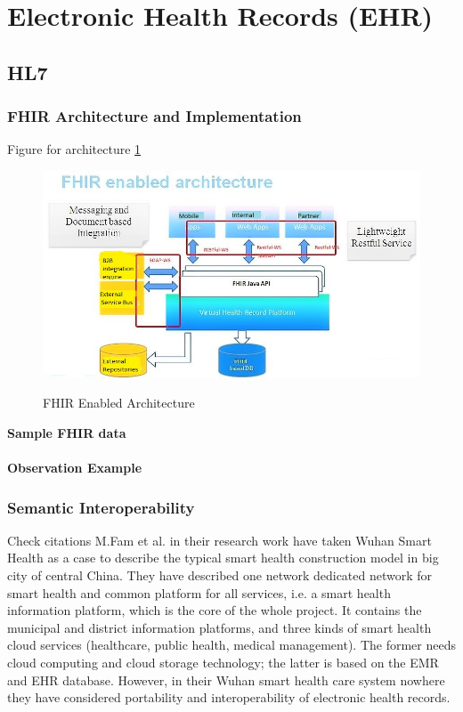 \documentclass[12pt,a4paper]{report}
\begin{document}
\section{Electronic Health Records (EHR)}
\subsection{HL7}
\subsubsection{FHIR Architecture and Implementation}
Figure for architecture \ref{figfhir}
\begin{figure}[h!]
	\begin{center}
		\includegraphics[scale=0.7]{arch.jpeg}
		\caption{FHIR Enabled Architecture} \cite{small}
		\label{figfhir}
	\end{center}
\end{figure}
\clearpage
{\bf Sample FHIR data}\\\\
{\bf Observation Example}


\clearpage

\subsubsection{Semantic Interoperability}
Check citations
M.Fam et al. in their research work \cite{fan2016smart} have taken Wuhan Smart Health as a case to describe
the typical smart health construction model in big city of central China. They have described one network dedicated network for smart health and common platform for all services, i.e. a smart health information platform, which is the core of the whole project. It contains the municipal
and district information platforms, and three kinds of
smart health cloud services (healthcare, public health,
medical management). The former needs cloud computing
and cloud storage technology; the latter is based on
the EMR and EHR database. However, in their Wuhan smart health care system nowhere they have considered portability and interoperability of electronic health records.\\
\end{document}
